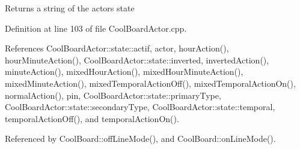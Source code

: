 \begin{DoxyReturn}{Returns}
a string of the actor\textquotesingle{}s state 
\end{DoxyReturn}


Definition at line 103 of file Cool\+Board\+Actor.\+cpp.



References Cool\+Board\+Actor\+::state\+::actif, actor, hour\+Action(), hour\+Minute\+Action(), Cool\+Board\+Actor\+::state\+::inverted, inverted\+Action(), minute\+Action(), mixed\+Hour\+Action(), mixed\+Hour\+Minute\+Action(), mixed\+Minute\+Action(), mixed\+Temporal\+Action\+Off(), mixed\+Temporal\+Action\+On(), normal\+Action(), pin, Cool\+Board\+Actor\+::state\+::primary\+Type, Cool\+Board\+Actor\+::state\+::secondary\+Type, Cool\+Board\+Actor\+::state\+::temporal, temporal\+Action\+Off(), and temporal\+Action\+On().



Referenced by Cool\+Board\+::off\+Line\+Mode(), and Cool\+Board\+::on\+Line\+Mode().

